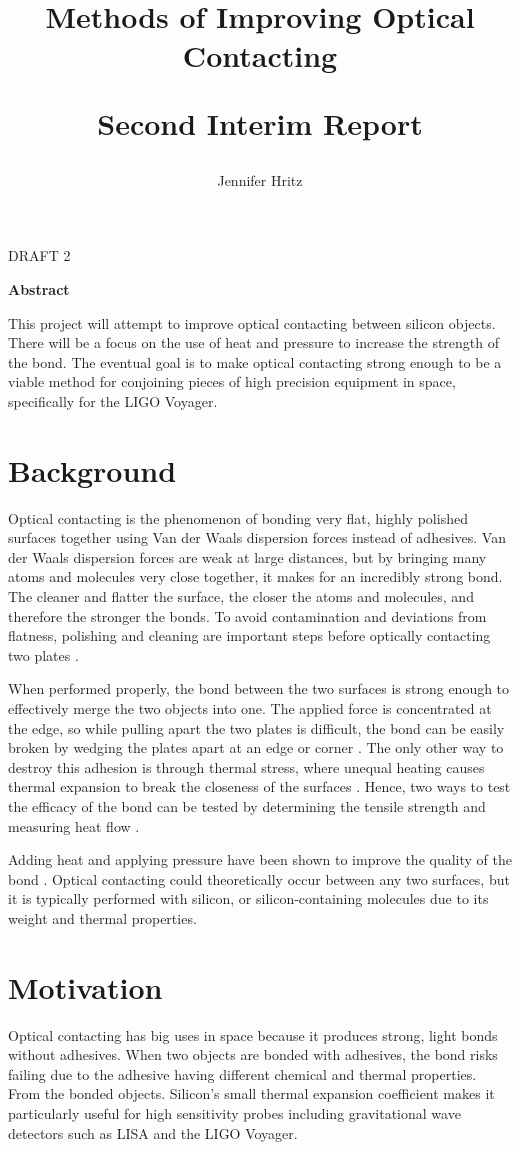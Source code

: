 \documentclass[colorlinks=true,pdfstartview=FitV,linkcolor=blue,
            citecolor=red,urlcolor=magenta]{ligodoc}
\title{Methods of Improving Optical Contacting

Second Interim Report}
\author{Jennifer Hritz}
\begin{document}
\begin{center}
\LARGE
{\color{red} DRAFT 2}
\end{center}

\begin{center}
\textbf{Abstract}
\end{center}

This project will attempt to improve optical contacting between silicon objects. There will be a focus on the use of heat and pressure to increase the strength of the bond. The eventual goal is to make optical contacting strong enough to be a viable method for conjoining pieces of high precision equipment in space, specifically for the LIGO Voyager.

\section{Background}
Optical contacting is the phenomenon of bonding very flat, highly polished surfaces together using Van der Waals dispersion forces instead of adhesives. Van der Waals dispersion forces are weak at large distances, but by bringing many atoms and molecules very close together, it makes for an incredibly strong bond. The cleaner and flatter the surface, the closer the atoms and molecules, and therefore the stronger the bonds. To avoid contamination and deviations from flatness, polishing and cleaning are important steps before optically contacting two plates \cite{Wright}.

When performed properly, the bond between the two surfaces is strong enough to effectively merge the two objects into one. The applied force is concentrated at the edge, so while pulling apart the two plates is difficult, the bond can be easily broken by wedging the plates apart at an edge or corner \cite{Rayleigh}. The only other way to destroy this adhesion is through thermal stress, where unequal heating causes thermal expansion to break the closeness of the surfaces \cite{Ferme}. Hence, two ways to test the efficacy of the bond can be tested by determining the tensile strength and measuring heat flow \cite{Wright, Zawada}.

Adding heat and applying pressure have been shown to improve the quality of the bond \cite{Zawada}. Optical contacting could theoretically occur between any two surfaces, but it is typically performed with silicon, or silicon-containing molecules due to its weight and thermal properties.

\section{Motivation}
\changestart[blue]
Optical contacting has big uses in space because it produces strong, light bonds without adhesives. When two objects are bonded with adhesives, the bond risks failing due to the adhesive having different chemical and thermal properties. From the bonded objects. Silicon’s small thermal expansion coefficient makes it particularly useful for high sensitivity probes \cite{Wright} including gravitational wave detectors such as LISA and the LIGO Voyager.
\end{document}
